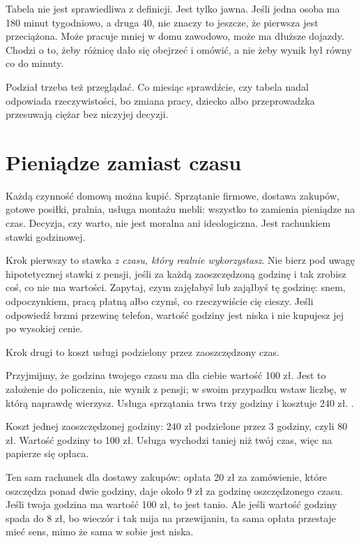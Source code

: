 Tabela nie jest sprawiedliwa z definicji. Jest tylko jawna. Jeśli jedna
osoba ma 180 minut tygodniowo, a druga 40, nie znaczy to jeszcze, że
pierwsza jest przeciążona. Może pracuje mniej w domu zawodowo, może ma
dłuższe dojazdy. Chodzi o to, żeby różnicę dało się obejrzeć i omówić, a
nie żeby wynik był równy co do minuty.

Podział trzeba też przeglądać. Co miesiąc sprawdźcie, czy tabela nadal
odpowiada rzeczywistości, bo zmiana pracy, dziecko albo przeprowadzka
przesuwają ciężar bez niczyjej decyzji.

\section{Pieniądze zamiast czasu}

Każdą czynność domową można kupić. Sprzątanie firmowe, dostawa zakupów,
gotowe posiłki, pralnia, usługa montażu mebli: wszystko to zamienia
pieniądze na czas. Decyzja, czy warto, nie jest moralna ani ideologiczna.
Jest rachunkiem stawki godzinowej.

Krok pierwszy to stawka \emph{z czasu, który realnie wykorzystasz}. Nie
bierz pod uwagę hipotetycznej stawki z pensji, jeśli za każdą zaoszczędzoną
godzinę i tak zrobisz coś, co nie ma wartości. Zapytaj, czym zajęłabyś lub
zająłbyś tę godzinę: snem, odpoczynkiem, pracą płatną albo czymś, co
rzeczywiście cię cieszy. Jeśli odpowiedź brzmi \glqq przewinę telefon\grqq{},
wartość godziny jest niska i nie kupujesz jej po wysokiej cenie.

Krok drugi to koszt usługi podzielony przez zaoszczędzony czas.

\begin{przyklad}
Przyjmijmy, że godzina twojego czasu ma dla ciebie wartość 100 zł. Jest to
założenie do policzenia, nie wynik z pensji; w swoim przypadku wstaw liczbę,
w którą naprawdę wierzysz. Usługa sprzątania trwa trzy godziny i kosztuje
240 zł. .

Koszt jednej zaoszczędzonej godziny: 240 zł podzielone przez 3 godziny,
czyli 80 zł. Wartość godziny to 100 zł. Usługa wychodzi taniej niż twój
czas, więc na papierze się opłaca.

Ten sam rachunek dla dostawy zakupów: opłata 20 zł za zamówienie, które oszczędza ponad dwie godziny, daje około 9 zł za godzinę oszczędzonego czasu. Jeśli twoja godzina ma wartość 100 zł, to jest tanio. Ale jeśli wartość godziny spada do 8 zł, bo wieczór i tak mija na przewijaniu, ta sama opłata przestaje mieć sens, mimo że sama w sobie jest niska.
\end{przyklad}

